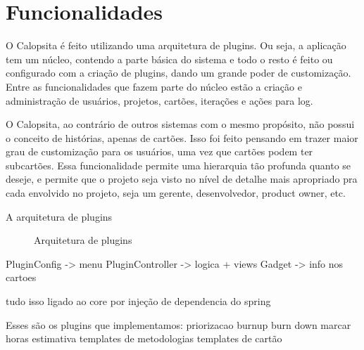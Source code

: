 \section{Funcionalidades}

O Calopsita é feito utilizando uma arquitetura de plugins. Ou seja, a aplicação tem um núcleo, contendo a parte básica do sistema e todo o resto é feito ou configurado com a criação de plugins, dando um grande poder de customização.
Entre as funcionalidades que fazem parte do núcleo estão a criação e administração de usuários,
projetos, cartões, iterações e ações para log.

O Calopsita, ao contrário de outros sistemas com o mesmo propósito, não possui o conceito de histórias, apenas de cartões. Isso foi feito pensando em trazer maior grau de customização para os usuários, uma vez que cartões podem ter subcartões. Essa funcionalidade permite uma hierarquia tão profunda quanto se deseje, e permite que o projeto seja visto no nível de detalhe mais apropriado pra cada envolvido no projeto, seja um gerente, desenvolvedor, product owner, etc.

A arquitetura de plugins

\begin{figure}[H]
  \centering
  \caption{Arquitetura de plugins}
\end{figure}

PluginConfig -> menu
PluginController -> logica + views
Gadget -> info nos cartoes

tudo isso ligado ao core por injeção de dependencia do spring


Esses são os plugins que implementamos:
priorizacao
burnup
burn down
marcar horas
estimativa
templates de metodologias
templates de cartão


